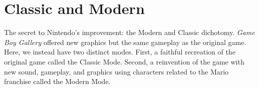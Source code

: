 \documentclass{book}
\begin{document}
\FloatBarrier\section*{Classic and Modern}
The secret to Nintendo’s improvement: the Modern and Classic dichotomy. \emph{Game Boy Gallery} offered new graphics but the same gameplay as the original game. Here, we instead have two distinct modes. First, a faithful recreation of the original game called the Classic Mode. Second, a reinvention of the game with new sound, gameplay, and graphics using characters related to the Mario franchise called the Modern Mode.\par
\FloatBarrier\vspace{\baselineskip}\centering
\begin{minipage}{0.45\linewidth}\captionsetup{labelformat=empty}\end{minipage}\vspace{2pt}
\begin{minipage}{0.45\linewidth}\captionsetup{labelformat=empty}\end{minipage}\vspace{2pt}
\begin{minipage}{0.45\linewidth}\captionsetup{labelformat=empty}\end{minipage}\vspace{2pt}
\begin{minipage}{0.45\linewidth}\captionsetup{labelformat=empty}\end{minipage}\vspace{2pt}
\begin{minipage}{0.45\linewidth}\captionsetup{labelformat=empty}\end{minipage}\vspace{2pt}
\begin{minipage}{0.45\linewidth}\captionsetup{labelformat=empty}\end{minipage}\vspace{2pt}
\end{document}
